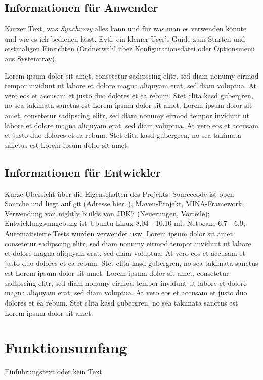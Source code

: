 \documentclass[12pt,oneside,a4paper,bibtotoc,liststotoc,pointlessnumbers]{scrartcl}
\begin{document}
\subsection{Informationen für Anwender}
Kurzer Text, was \textit{Synchrony} alles kann und für was man es verwenden könnte und wie es ich bedienen lässt. Evtl. ein kleiner User's Guide zum Starten und erstmaligen Einrichten (Ordnerwahl über Konfigurationsdatei oder Optionsmenü aus Systemtray).

\vspace{12px}
Lorem ipsum dolor sit amet, consetetur sadipscing elitr, sed diam nonumy eirmod tempor invidunt ut labore et dolore magna aliquyam erat, sed diam voluptua. At vero eos et accusam et justo duo dolores et ea rebum. Stet clita kasd gubergren, no sea takimata sanctus est Lorem ipsum dolor sit amet. Lorem ipsum dolor sit amet, consetetur sadipscing elitr, sed diam nonumy eirmod tempor invidunt ut labore et dolore magna aliquyam erat, sed diam voluptua. At vero eos et accusam et justo duo dolores et ea rebum. Stet clita kasd gubergren, no sea takimata sanctus est Lorem ipsum dolor sit amet.
\subsection{Informationen für Entwickler}
Kurze Übersicht über die Eigenschaften des Projekts: Sourcecode ist open Sourche und liegt auf git (Adresse hier..), Maven-Projekt, MINA-Framework, Verwendung von nightly builds von JDK7 (Neuerungen, Vorteile); Entwicklungsumgebung ist Ubuntu Linux 8.04 - 10.10 mit Netbeans 6.7 - 6.9; Automatisierte Tests wurden verwendet usw.
\vspace{12px}
Lorem ipsum dolor sit amet, consetetur sadipscing elitr, sed diam nonumy eirmod tempor invidunt ut labore et dolore magna aliquyam erat, sed diam voluptua. At vero eos et accusam et justo duo dolores et ea rebum. Stet clita kasd gubergren, no sea takimata sanctus est Lorem ipsum dolor sit amet. Lorem ipsum dolor sit amet, consetetur sadipscing elitr, sed diam nonumy eirmod tempor invidunt ut labore et dolore magna aliquyam erat, sed diam voluptua. At vero eos et accusam et justo duo dolores et ea rebum. Stet clita kasd gubergren, no sea takimata sanctus est Lorem ipsum dolor sit amet.

\newpage
\section{Funktionsumfang}
Einführungstext oder kein Text
\end{document}
